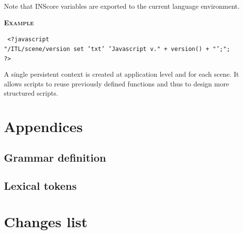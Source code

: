 \documentclass[a4paper,twoside]{report}
\newcommand{\toplevel}[1]	{\chapter{#1}}
\newcommand{\sublevel}[1]	{\section{#1}}
\newcommand{\OSC}[1]		{\texttt{#1}}
\newcommand{\example}		{\textbf{\hspace{-1.5cm}\textbf{\textsc{Example }}}}
\newcommand{\note}	[1]		{\vspace{2mm}\textbf{\hspace{-1.03cm}\textbf{\textsc{Note #1}}}}
\newcommand{\sample}	[1]			{\vspace{-2mm}\begin{center}\colorbox{mygrey}{
								\begin{minipage}[t]{0.9\columnwidth} 
								{\small \texttt{#1}}
								\end{minipage}}\end{center}}
\begin{document}
Note that INScore variables are exported to the current language environment.

\example
\sample{
<?javascript \\
\hspace*{3mm} "/ITL/scene/version set 'txt' 'Javascript v."  + version() + "';"; \\
\hspace*{1mm} ?>
}


A single persistent context is created at application level and for each scene.
It allows scripts to reuse previously defined functions and thus to design more structured scripts.

%


\toplevel{Appendices}
\sublevel{Grammar definition}
\label{yacc}


\sublevel{Lexical tokens}
\label{lex}



\toplevel{ Changes list}
\label{changes}



\printindex
\end{document}
